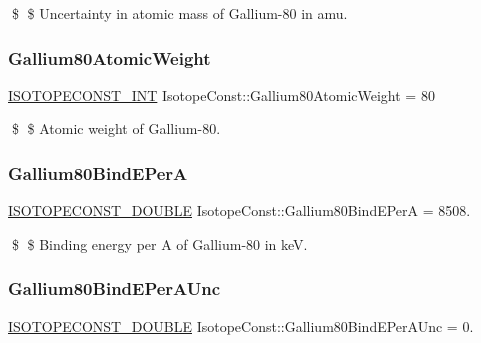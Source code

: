 \$ \$ Uncertainty in atomic mass of Gallium-\/80 in amu. \mbox{\label{group___isotope_const-_gallium-_ga80_ga75ded49aa4db2d22ec04b3d826c6b0c2}} 
\subsubsection{\texorpdfstring{Gallium80\+Atomic\+Weight}{Gallium80AtomicWeight}}
{\footnotesize\ttfamily \mbox{\hyperlink{group___isotope_const-_macros_ga5f18360b3e99483a35c32d789e62621c}{I\+S\+O\+T\+O\+P\+E\+C\+O\+N\+S\+T\+\_\+\+I\+NT}} Isotope\+Const\+::\+Gallium80\+Atomic\+Weight = 80}

\$ \$ Atomic weight of Gallium-\/80. \mbox{\label{group___isotope_const-_gallium-_ga80_gac61e450441c509023f8d37e4d044206b}} 
\subsubsection{\texorpdfstring{Gallium80\+Bind\+E\+PerA}{Gallium80BindEPerA}}
{\footnotesize\ttfamily \mbox{\hyperlink{group___isotope_const-_macros_ga8f45a7272ce02c0b4c65c44636ed719a}{I\+S\+O\+T\+O\+P\+E\+C\+O\+N\+S\+T\+\_\+\+D\+O\+U\+B\+LE}} Isotope\+Const\+::\+Gallium80\+Bind\+E\+PerA = 8508.}

\$ \$ Binding energy per A of Gallium-\/80 in keV. \mbox{\label{group___isotope_const-_gallium-_ga80_gae95270979180a9c2f97cc7c3f4a8a9fa}} 
\subsubsection{\texorpdfstring{Gallium80\+Bind\+E\+Per\+A\+Unc}{Gallium80BindEPerAUnc}}
{\footnotesize\ttfamily \mbox{\hyperlink{group___isotope_const-_macros_ga8f45a7272ce02c0b4c65c44636ed719a}{I\+S\+O\+T\+O\+P\+E\+C\+O\+N\+S\+T\+\_\+\+D\+O\+U\+B\+LE}} Isotope\+Const\+::\+Gallium80\+Bind\+E\+Per\+A\+Unc = 0.}

